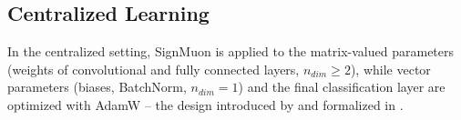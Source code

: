 \documentclass[letterpaper]{article} %
\begin{document}
\subsection{Centralized Learning}
In the centralized setting, SignMuon is applied to the matrix-valued parameters (weights of convolutional and fully connected layers, $n_{dim}\ge 2$), while vector parameters (biases, BatchNorm, $n_{dim} = 1$) and the final classification layer are optimized with AdamW -- the design introduced by \citet{jordan2024muon} and formalized in \cite{li2025note, riabinin2025gluon}.
\end{document}
